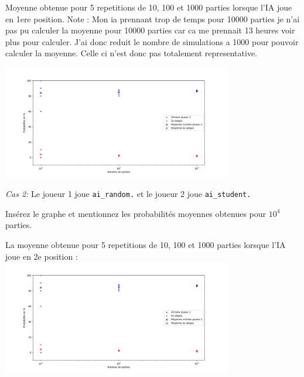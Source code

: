 \documentclass[11pt,answers]{exam}
\begin{document}
\begin{solutionbox}{100mm}
Moyenne obtenue pour 5 repetitions de 10, 100 et 1000 parties lorsque l'IA joue en 1ere position.\newline
Note : Mon ia prennant trop de temps pour 10000 parties je n'ai pas pu calculer la moyenne pour 10000 parties car ca me prennait 13 heures voir plus pour calculer. J'ai donc reduit le nombre de simulations a 1000 pour pouvoir calculer la moyenne. Celle ci n'est donc pas totalement representative.

\centering
\includegraphics[width=0.75\textwidth]{ai_student_player=1_N=5.png}
\end{solutionbox}

\medskip

\emph{Cas 2:} Le joueur 1 joue \texttt{ai\_random.} et le joueur 2 joue \texttt{ai\_student.}

\begin{solutionbox}{100mm}
Insérez le graphe et mentionnez les probabilités moyennes obtenues pour $10^4$ parties.

\centering
La moyenne obtenue pour 5 repetitions de 10, 100 et 1000 parties lorsque l'IA joue en 2e position :
\includegraphics[width=0.75\textwidth]{ai_student_player=1_N=5.png}
\end{solutionbox}
\end{document}
